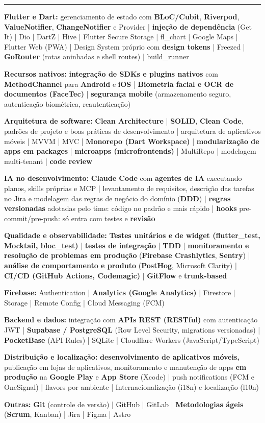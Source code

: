 \documentclass[9pt,a4paper]{extarticle}
\newcommand{\lbl}[1]{\textbf{#1}}
\newenvironment{tight}{%
  \begin{list}{\textcolor{rule}{\rule[0.18em]{0.32em}{0.32em}}}{%
    \setlength{\leftmargin}{1.15em}%
    \setlength{\labelwidth}{0.60em}%
    \setlength{\labelsep}{0.55em}%
    \setlength{\topsep}{0.30em}%
    \setlength{\itemsep}{0.32em}%
    \setlength{\parsep}{0pt}%
    \setlength{\partopsep}{0pt}%
    \setlength{\rightmargin}{0pt}%
  }%
}{\end{list}}
\begin{document}
\begin{tight}
  \item \lbl{Flutter e Dart:} gerenciamento de estado com \textbf{BLoC/Cubit}, \textbf{Riverpod}, \textbf{ValueNotifier}, \textbf{ChangeNotifier} e Provider | \textbf{injeção de dependência} (Get It) | Dio | DartZ | Hive | Flutter Secure Storage | fl\_chart | Google Maps | Flutter Web (PWA) | Design System próprio com \textbf{design tokens} | Freezed | \textbf{GoRouter} (rotas aninhadas e shell routes) | build\_runner
  \item \lbl{Recursos nativos:} \textbf{integração de SDKs e plugins nativos} com \textbf{MethodChannel} para \textbf{Android} e \textbf{iOS} | \textbf{Biometria facial e OCR de documentos (FaceTec)} | \textbf{segurança mobile} (armazenamento seguro, autenticação biométrica, reautenticação)
  \item \lbl{Arquitetura de software:} \textbf{Clean Architecture} | \textbf{SOLID}, \textbf{Clean Code}, padrões de projeto e boas práticas de desenvolvimento | arquitetura de aplicativos móveis | MVVM | MVC | \textbf{Monorepo (Dart Workspace)} | \textbf{modularização de apps em packages} | \textbf{microapps (microfrontends)} | MultiRepo | modelagem multi-tenant | \textbf{code review}
  \item \lbl{IA no desenvolvimento:} \textbf{Claude Code} com \textbf{agentes de IA} executando planos, skills próprias e MCP | levantamento de requisitos, descrição das tarefas no Jira e modelagem das regras de negócio do domínio (\textbf{DDD}) | \textbf{regras versionadas} adotadas pelo time: código no padrão e mais rápido | \textbf{hooks} pre-commit/pre-push: só entra com testes e \textbf{revisão}
  \item \lbl{Qualidade e observabilidade:} \textbf{Testes unitários e de widget (flutter\_test, Mocktail, bloc\_test)} | \textbf{testes de integração} | \textbf{TDD} | \textbf{monitoramento e resolução de problemas em produção} (\textbf{Firebase Crashlytics}, \textbf{Sentry}) | \textbf{análise de comportamento e produto} (\textbf{PostHog}, Microsoft Clarity) | \textbf{CI/CD (GitHub Actions, Codemagic)} | \textbf{GitFlow} e \textbf{trunk-based}
  \item \lbl{Firebase:} Authentication | \textbf{Analytics (Google Analytics)} | Firestore | Storage | Remote Config | Cloud Messaging (FCM)
  \item \lbl{Backend e dados:} integração com \textbf{APIs REST (RESTful)} com autenticação JWT | \textbf{Supabase / PostgreSQL} (Row Level Security, migrations versionadas) | \textbf{PocketBase} (API Rules) | SQLite | Cloudflare Workers (JavaScript/TypeScript)
  \item \lbl{Distribuição e localização:} \textbf{desenvolvimento de aplicativos móveis,} publicação em lojas de aplicativos, monitoramento e manutenção de apps \textbf{em produção} na \textbf{Google Play} e \textbf{App Store} (Xcode) | push notifications (FCM e OneSignal) | flavors por ambiente | Internacionalização (i18n) e localização (l10n)
  \item \lbl{Outras:} \textbf{Git} (controle de versão) | GitHub | GitLab | \textbf{Metodologias ágeis} (\textbf{Scrum}, Kanban) | Jira | Figma | Astro
\end{tight}
\end{document}
